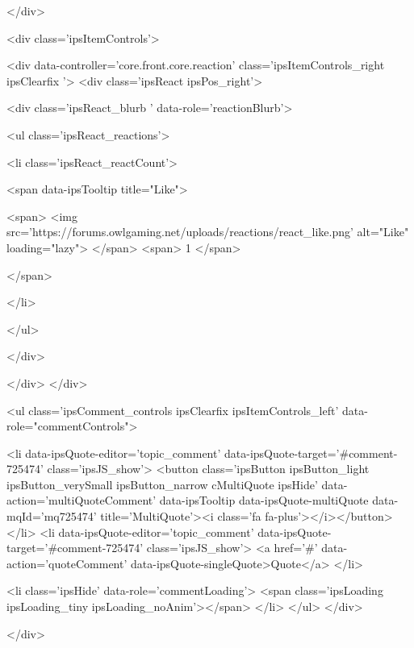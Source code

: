 			
		</div>

		
			<div class='ipsItemControls'>
				
					
						

	<div data-controller='core.front.core.reaction' class='ipsItemControls_right ipsClearfix '>	
		<div class='ipsReact ipsPos_right'>
			
				
				<div class='ipsReact_blurb ' data-role='reactionBlurb'>
					
						

	
	<ul class='ipsReact_reactions'>
		
		
			
				
				<li class='ipsReact_reactCount'>
					
						<span data-ipsTooltip title="Like">
					
							<span>
								<img src='https://forums.owlgaming.net/uploads/reactions/react_like.png' alt="Like" loading="lazy">
							</span>
							<span>
								1
							</span>
					
						</span>
					
				</li>
			
		
	</ul>

					
				</div>
			
			
			
		</div>
	</div>

					
				
				<ul class='ipsComment_controls ipsClearfix ipsItemControls_left' data-role="commentControls">
					
						
							<li data-ipsQuote-editor='topic_comment' data-ipsQuote-target='#comment-725474' class='ipsJS_show'>
								<button class='ipsButton ipsButton_light ipsButton_verySmall ipsButton_narrow cMultiQuote ipsHide' data-action='multiQuoteComment' data-ipsTooltip data-ipsQuote-multiQuote data-mqId='mq725474' title='MultiQuote'><i class='fa fa-plus'></i></button>
							</li>
							<li data-ipsQuote-editor='topic_comment' data-ipsQuote-target='#comment-725474' class='ipsJS_show'>
								<a href='#' data-action='quoteComment' data-ipsQuote-singleQuote>Quote</a>
							</li>
						
						
						
					
					<li class='ipsHide' data-role='commentLoading'>
						<span class='ipsLoading ipsLoading_tiny ipsLoading_noAnim'></span>
					</li>
				</ul>
			</div>
		

		
	</div>

	

